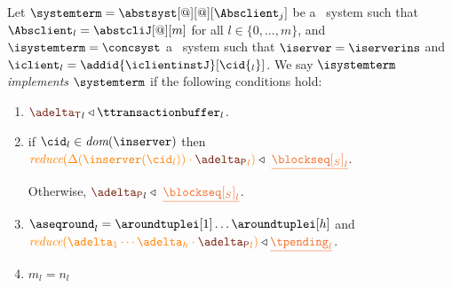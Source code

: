 \begin{definition} \label{def:implementation}
Let  $\systemterm = \abstsyst[@][@][\Absclient_j]$ be a \tgspcalculus\ system
 such that $\Absclient_l={\abstcliJ[@][m]}$ for all
$l\in\{0,\ldots,m\}$, and  $\isystemterm = \concsyst$  a \igsp\  system such that  $\iserver = \iserverins$ and $\iclient_l = \addid{\iclientinstJ}[{\cid{_l}}]$.
 We say {\em $\isystemterm$ implements $\systemterm$} if the following conditions hold:


\newpage

\begin{enumerate}
	\item \label{prop_transactions} ${\transactionbuffer}_l\triangleleft{\ttransactionbuffer}_l$.
	\item \label{prop_sent}  
	   
	   if $\cid_l \in \dom\inserver$%
	   then 
	 $ \ireduce{\igetdeltas{\inserver(\cid_l)}\cdot {\pushbuffer}_l} \triangleleft \ \flatten{{\tsent}_l}$. 
	 
	 Otherwise,
	      ${\pushbuffer}_l \triangleleft \ \flatten{{\tsent}_l}$.

%
%	

	\item \label{prop_pending} $\pending_l = \aroundtuplei[1]\ldots\aroundtuplei[h]$ and 
		$\ireduce{\adelta_1\cdots\adelta_h\cdot {\pushbuffer}_l} \triangleleft \flatten{\tpending_l}$.
	\item  \label{prop_size_buffersent} $m_l = n_l$ 
	

\end{enumerate}
\end{definition}
